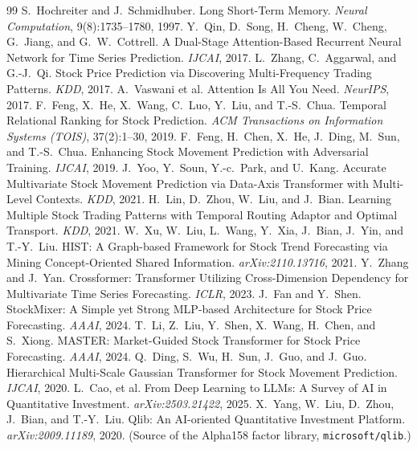 \documentclass[a4paper,11pt]{article}
\begin{document}
\begin{thebibliography}{99}
\small
{} S.~Hochreiter and J.~Schmidhuber. Long Short-Term Memory. \emph{Neural Computation}, 9(8):1735--1780, 1997.
 Y.~Qin, D.~Song, H.~Cheng, W.~Cheng, G.~Jiang, and G.~W.~Cottrell. A Dual-Stage Attention-Based Recurrent Neural Network for Time Series Prediction. \emph{IJCAI}, 2017.
 L.~Zhang, C.~Aggarwal, and G.-J.~Qi. Stock Price Prediction via Discovering Multi-Frequency Trading Patterns. \emph{KDD}, 2017.
 A.~Vaswani et al. Attention Is All You Need. \emph{NeurIPS}, 2017.
 F.~Feng, X.~He, X.~Wang, C.~Luo, Y.~Liu, and T.-S.~Chua. Temporal Relational Ranking for Stock Prediction. \emph{ACM Transactions on Information Systems (TOIS)}, 37(2):1--30, 2019.
 F.~Feng, H.~Chen, X.~He, J.~Ding, M.~Sun, and T.-S.~Chua. Enhancing Stock Movement Prediction with Adversarial Training. \emph{IJCAI}, 2019.
 J.~Yoo, Y.~Soun, Y.-c.~Park, and U.~Kang. Accurate Multivariate Stock Movement Prediction via Data-Axis Transformer with Multi-Level Contexts. \emph{KDD}, 2021.
 H.~Lin, D.~Zhou, W.~Liu, and J.~Bian. Learning Multiple Stock Trading Patterns with Temporal Routing Adaptor and Optimal Transport. \emph{KDD}, 2021.
 W.~Xu, W.~Liu, L.~Wang, Y.~Xia, J.~Bian, J.~Yin, and T.-Y.~Liu. HIST: A Graph-based Framework for Stock Trend Forecasting via Mining Concept-Oriented Shared Information. \emph{arXiv:2110.13716}, 2021.
 Y.~Zhang and J.~Yan. Crossformer: Transformer Utilizing Cross-Dimension Dependency for Multivariate Time Series Forecasting. \emph{ICLR}, 2023.
 J.~Fan and Y.~Shen. StockMixer: A Simple yet Strong MLP-based Architecture for Stock Price Forecasting. \emph{AAAI}, 2024.
 T.~Li, Z.~Liu, Y.~Shen, X.~Wang, H.~Chen, and S.~Xiong. MASTER: Market-Guided Stock Transformer for Stock Price Forecasting. \emph{AAAI}, 2024.
 Q.~Ding, S.~Wu, H.~Sun, J.~Guo, and J.~Guo. Hierarchical Multi-Scale Gaussian Transformer for Stock Movement Prediction. \emph{IJCAI}, 2020.
 L.~Cao, et al. From Deep Learning to LLMs: A Survey of AI in Quantitative Investment. \emph{arXiv:2503.21422}, 2025.
 X.~Yang, W.~Liu, D.~Zhou, J.~Bian, and T.-Y.~Liu. Qlib: An AI-oriented Quantitative Investment Platform. \emph{arXiv:2009.11189}, 2020. (Source of the Alpha158 factor library, \texttt{microsoft/qlib}.)
\end{thebibliography}
\end{document}
